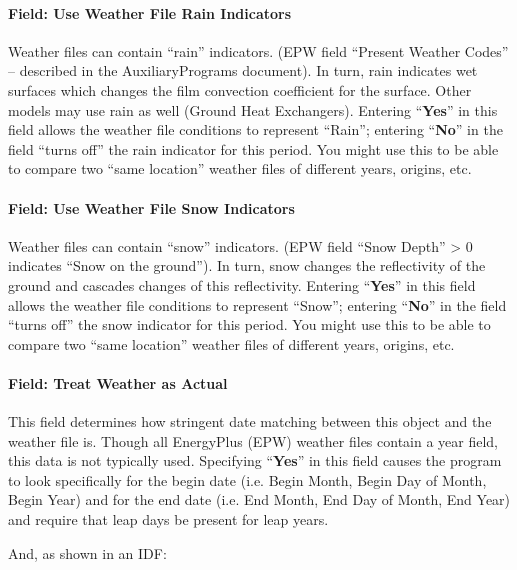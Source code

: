 \paragraph{Field: Use Weather File Rain Indicators}\label{field-use-weather-file-rain-indicators-1}

Weather files can contain ``rain'' indicators. (EPW field ``Present Weather Codes'' -- described in the
AuxiliaryPrograms document). In turn, rain indicates wet surfaces which changes the film convection
coefficient for the surface. Other models may use rain as well (Ground Heat Exchangers). Entering
``\textbf{Yes}'' in this field allows the weather file conditions to represent ``Rain''; entering
``\textbf{No}'' in the field ``turns off'' the rain indicator for this period. You might use this
to be able to compare two ``same location'' weather files of different years, origins, etc.

\paragraph{Field: Use Weather File Snow Indicators}\label{field-use-weather-file-snow-indicators-1}

Weather files can contain ``snow'' indicators. (EPW field ``Snow Depth'' \textgreater{} 0 indicates
``Snow on the ground''). In turn, snow changes the reflectivity of the ground and cascades changes of this
reflectivity. Entering ``\textbf{Yes}'' in this field allows the weather file conditions to represent
``Snow''; entering ``\textbf{No}'' in the field ``turns off'' the snow indicator for this period. You might
use this to be able to compare two ``same location'' weather files of different years, origins, etc.

\paragraph{Field: Treat Weather as Actual}\label{field-treat-weather-as-actual}

This field determines how stringent date matching between this object and the weather file is. Though all
EnergyPlus (EPW) weather files contain a year field, this data is not typically used. Specifying
``\textbf{Yes}'' in this field causes the program to look specifically for the begin date (i.e. Begin Month,
Begin Day of Month, Begin Year) and for the end date (i.e. End Month, End Day of Month, End Year) and require
that leap days be present for leap years.

And, as shown in an IDF:

